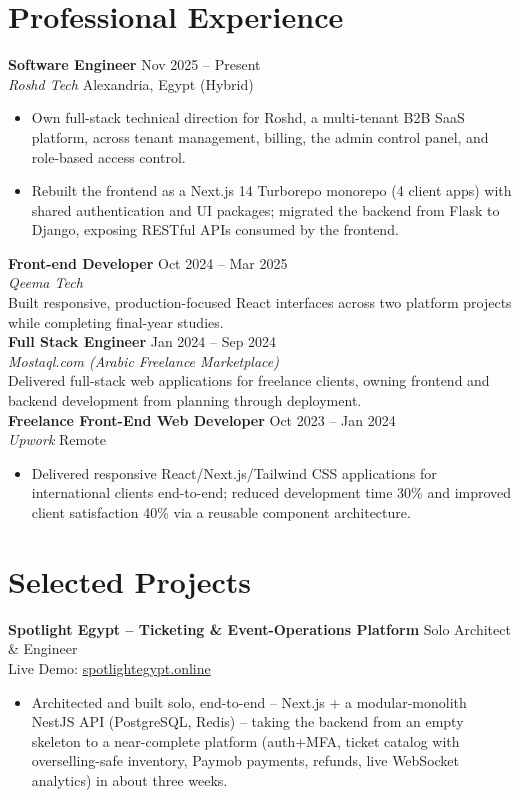 \documentclass[10pt,letterpaper]{article}
\newcommand{\sectionrule}{\vspace{-1pt}{\color{hairline}\hrule height 0.6pt}\vspace{2pt}}
\newcommand{\entryHeading}[4]{%
  \textbf{#1} \hfill {\small\color{muted}#2}\\
  {\small\color{muted}\textit{#3}} \hfill {\small\color{muted}#4}\\[0pt]
}
\newcommand{\lineHeading}[2]{%
  \textbf{#1} \hfill {\small\color{muted}#2}\\[0pt]
}
\newcommand{\linkLine}[3]{{\footnotesize\color{muted}#1: }{\footnotesize\href{#2}{#3}}\\[0pt]}
\newcommand{\shortEntry}[4]{%
  \textbf{#1} \hfill {\small\color{muted}#2}\\
  {\small\color{muted}\textit{#3}}\\
  {\small #4}\\[1pt]
}
\begin{document}
\section*{Professional Experience}
\sectionrule

\entryHeading{Software Engineer}{Nov 2025 -- Present}{Roshd Tech}{Alexandria, Egypt (Hybrid)}
{\small
\begin{itemize}
    \item Own full-stack technical direction for Roshd, a multi-tenant B2B SaaS platform, across tenant
    management, billing, the admin control panel, and role-based access control.
    \item Rebuilt the frontend as a Next.js 14 Turborepo monorepo (4 client apps) with shared authentication
    and UI packages; migrated the backend from Flask to Django, exposing RESTful APIs consumed by the frontend.
\end{itemize}
}

\shortEntry{Front-end Developer}{Oct 2024 -- Mar 2025}{Qeema Tech}{Built responsive, production-focused React interfaces across two platform projects while completing final-year studies.}

\shortEntry{Full Stack Engineer}{Jan 2024 -- Sep 2024}{Mostaql.com (Arabic Freelance Marketplace)}{Delivered full-stack web applications for freelance clients, owning frontend and backend development from planning through deployment.}

\entryHeading{Freelance Front-End Web Developer}{Oct 2023 -- Jan 2024}{Upwork}{Remote}
{\small
\begin{itemize}
    \item Delivered responsive React/Next.js/Tailwind CSS applications for international clients end-to-end;
    reduced development time 30\% and improved client satisfaction 40\% via a reusable component architecture.
\end{itemize}
}

\section*{Selected Projects}
\sectionrule
\lineHeading{Spotlight Egypt -- Ticketing \& Event-Operations Platform}{Solo Architect \& Engineer}
\linkLine{Live Demo}{https://spotlightegypt.online/}{spotlightegypt.online}
{\small
\begin{itemize}
    \item Architected and built solo, end-to-end -- Next.js + a modular-monolith NestJS API (PostgreSQL, Redis)
    -- taking the backend from an empty skeleton to a near-complete platform (auth+MFA, ticket catalog with
    overselling-safe inventory, Paymob payments, refunds, live WebSocket analytics) in about three weeks.
\end{itemize}
}
\end{document}
